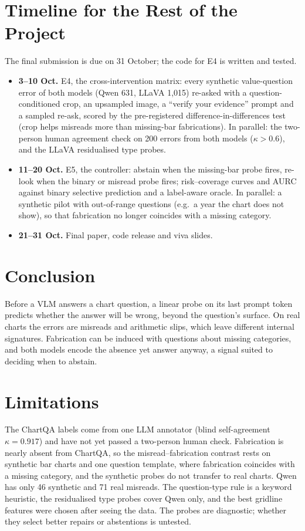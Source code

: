 \documentclass[11pt]{article}
\begin{document}
\section{Timeline for the Rest of the Project}
\label{sec:timeline}

The final submission is due on 31 October; the code for E4 is written and tested.
\begin{itemize}\itemsep0pt
\item \textbf{3--10 Oct.} E4, the cross-intervention matrix: every synthetic
value-question error of both models (Qwen 631, LLaVA 1,015) re-asked with a
question-conditioned crop, an upsampled image, a ``verify your evidence'' prompt
and a sampled re-ask, scored by the pre-registered difference-in-differences test
(crop helps misreads more than missing-bar fabrications). In parallel: the
two-person human agreement check on 200 errors from both models
($\kappa>0.6$), and the LLaVA residualised type probes.
\item \textbf{11--20 Oct.} E5, the controller: abstain when the missing-bar probe
fires, re-look when the binary or misread probe fires; risk--coverage curves and
AURC against binary selective prediction and a label-aware oracle. In parallel:
a synthetic pilot with out-of-range questions (e.g.\ a year the chart does not
show), so that fabrication no longer coincides with a missing category.
\item \textbf{21--31 Oct.} Final paper, code release and viva slides.
\end{itemize}

\section{Conclusion}

Before a VLM answers a chart question, a linear probe on its last prompt token
predicts whether the answer will be wrong, beyond the question's surface. On real
charts the errors are misreads and arithmetic slips, which leave different
internal signatures. Fabrication can be induced with questions about missing
categories, and both models encode the absence yet answer anyway, a signal suited
to deciding when to abstain.

\section*{Limitations}

The ChartQA labels come from one LLM annotator (blind self-agreement
$\kappa=0.917$) and have not yet passed a two-person human check. Fabrication is
nearly absent from ChartQA, so the misread--fabrication contrast rests on
synthetic bar charts and one question template, where fabrication coincides with
a missing category, and the synthetic probes do not transfer to real charts.
Qwen has only 46 synthetic and 71 real misreads. The question-type rule is a
keyword heuristic, the residualised type probes cover Qwen only, and the best
gridline features were chosen after seeing the data. The probes are diagnostic;
whether they select better repairs or abstentions is untested.
\end{document}
